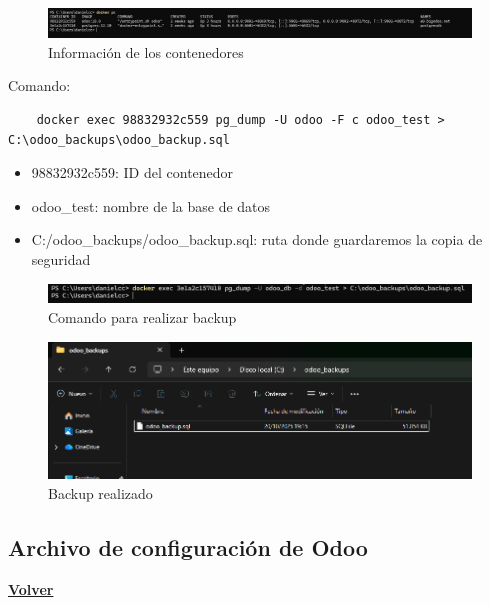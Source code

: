 \documentclass[a4paper,12pt]{article}
\begin{document}
\begin{figure}[h!]
    \centering
    \includegraphics[width=1\textwidth]{pr2odoo79-dockerPS.png}
    \caption{Información de los contenedores}
\end{figure}
\FloatBarrier

Comando: 
\begin{verbatim}
    docker exec 98832932c559 pg_dump -U odoo -F c odoo_test > C:\odoo_backups\odoo_backup.sql 
\end{verbatim}

\begin{itemize}
    \item 98832932c559: ID del contenedor
    \item odoo\_test: nombre de la base de datos
    \item C:/odoo\_backups/odoo\_backup.sql: ruta donde guardaremos la copia de seguridad
\end{itemize}

\begin{figure}[h!]
    \centering
    \includegraphics[width=1\textwidth]{pr2odoo80-comandoBackup.png}
    \caption{Comando para realizar backup}
\end{figure}
\FloatBarrier

\begin{figure}[h!]
    \centering
    \includegraphics[width=1\textwidth]{pr2odoo81-backupRealizado.png}
    \caption{Backup realizado}
\end{figure}
\FloatBarrier

\subsection{Archivo de configuración de Odoo}
\hyperlink{anchor-indice}{\textbf{Volver}}\\
\end{document}
